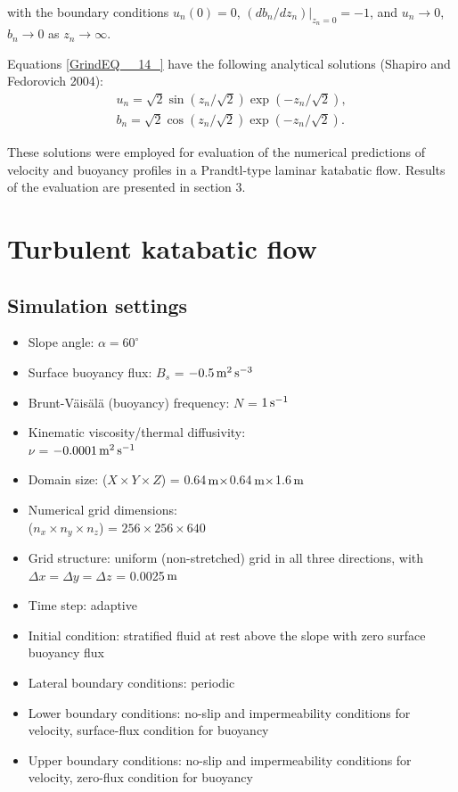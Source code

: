 \documentclass[gmd]{copernicus}
\begin{document}
\noindent with the boundary conditions $u_{n} (0)=0$, $\left. (db_{n} /dz_{n} )\right|_{z_{n} =0} =-1$, and $u_{n} \to 0$, $b_{n} \to 0$ as $z_{n} \to \infty $.

Equations \eqref{GrindEQ__14_} have the following analytical solutions (Shapiro and Fedorovich 2004):
\begin{eqnarray} \label{GrindEQ__18_} 
u_{n} =\sqrt{2} \sin (z_{n} /\sqrt{2} )\exp (-z_{n} /\sqrt{2} ),\\b_{n} =\sqrt{2} \cos (z_{n} /\sqrt{2} )\exp (-z_{n} /\sqrt{2} ).  
\end{eqnarray} 


\noindent These solutions were employed for evaluation of the numerical predictions of velocity and buoyancy profiles in a Prandtl-type laminar katabatic flow. Results of the evaluation are presented in section 3.

\section{Turbulent katabatic flow}
\smallskip

\subsection{Simulation settings}
\smallskip
\begin{itemize}
  \setlength{\itemsep}{0pt}
  \setlength{\parskip}{0pt}
  \setlength{\parsep}{0pt}  
  \item Slope angle: $\alpha = 60^{\circ}$
  \item Surface buoyancy flux: $B_{s} $ = $-0.5{\rm\, m}^{\rm 2}\, {\rm s}^{{\rm -3}} $
  \item Brunt-V\"{a}is\"{a}l\"{a} (buoyancy) frequency: $N$ = $1\,{\rm s}^{{\rm -1}}$
  \item Kinematic viscosity/thermal diffusivity:\\$\nu$ = $-0.0001{\rm\, m}^{\rm 2}\, {\rm s}^{{\rm -1}} $
  \item Domain size: ($X{\times}Y{\times}Z$) = 0.64${\rm\, m}\times$0.64${\rm\, m}\times$1.6${\rm\, m}$
  \item Numerical grid dimensions: \\($n_x{\times}n_y{\times}n_z$) = $256 \times 256 \times 640$
  \item Grid structure: uniform (non-stretched) grid in all three directions, with $\Delta x = \Delta y = \Delta z$ = 0.0025${\rm\, m}$
  \item Time step: adaptive
  \item Initial condition: stratified fluid at rest above the slope with zero surface buoyancy flux
  \item Lateral boundary conditions: periodic
  \item Lower boundary conditions: no-slip and impermeability conditions for velocity, surface-flux condition for buoyancy
  \item Upper boundary conditions: no-slip and impermeability conditions for velocity, zero-flux condition for buoyancy
\end{itemize}
\end{document}
